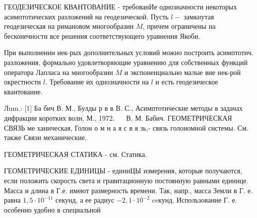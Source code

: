 \documentclass[10pt]{article}
\begin{document}
ГЕОДЕЗИЧЕСКОЕ КВАНТОВАНИЕ - требованИе однозначности некоторых асимптотических разложений на геодезической. Пусть $l-$ замкнутая геодезическая на римановом многообразии $M$, причем ограничены на бесконечности все решения соответствующего уравнения Якоби.



При выполнении нек-рых дополнительных условий можно построить асимптотич. разложения, формально удовлетворяющие уравнению для собственных функций оператора Лапласа на многообразии $M$ и экспоненциально малые вне нек-рой окрестности $l$. Требование их однозначности на $l$ и есть геодезическое квантование.



Лum.: [1] Ба бич В. М., Булды р в в В. С., Асимптотические методы в задачах дифракции коротких волн, М., 1972. $\quad$ В. М. Бабич. ГЕОМЕТРИЧЕСКАЯ СВЯЗЬ ме ханическая, Голон о м н а я с в я зь,- связь голономной системы. См. также Связи механические.



ГЕОМЕТРИЧЕСКАЯ СТАТИКА - см. Статика.



ГЕОМЕТРИЧЕСКИЕ ЕДИНИЦЫ - единиЦЫ измерения, которые получаются, если положить скорость света и гравитационную постоянную равными единице. Масса и длина в Г.е. имеют размерность времени. Так, напр., масса Земли в Г. е. равна $1,5 \cdot 10^{-11}$ секунд, а ее радиус $-2,1 \cdot 10^{-2}$ ceкунд. Использование Г. е. особенно удобно в специальной
\end{document}
